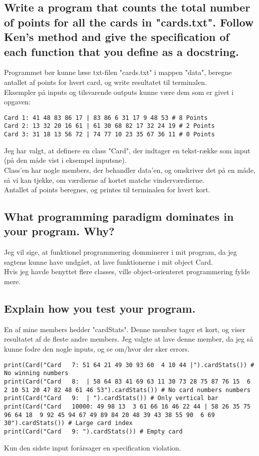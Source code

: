 \documentclass[a4paper,12pt]{article}
\begin{document}
\subsection[Write a program that counts the total number of points for all the cards]{Write a program that counts the total number of points for all the cards in "cards.txt".
Follow Ken's method and give the specification of each function that you define as a docstring.}

Programmet bør kunne læse txt-filen "cards.txt" i mappen "data", beregne antallet af points for hvert card, og write resultatet til terminalen.\\
Eksempler på inputs og tilsvarende outputs kunne være dem som er givet i opgaven:
\begin{lstlisting}
Card 1: 41 48 83 86 17 | 83 86 6 31 17 9 48 53 # 8 Points
Card 2: 13 32 20 16 61 | 61 30 68 82 17 32 24 19 # 2 Points
Card 3: 31 18 13 56 72 | 74 77 10 23 35 67 36 11 # 0 Points
\end{lstlisting} 
Jeg har valgt, at definere en class "Card", der indtager en tekst-række som input (på den måde vist i eksempel inputsne).\\
Class'en har nogle members, der behandler data'en, og omskriver det på en måde, så vi kan tjekke, om værdierne af kortet matche vinderværdierne.\\
Antallet af points beregnes, og printes til terminalen for hvert kort.

\subsection[What programming paradigm dominates in your program]{What programming paradigm dominates in your program. Why?}

Jeg vil sige, at funktionel programmering domminerer i mit program, da jeg sagtens kunne have undgået, at lave funktionerne i mit object Card.\\
Hvis jeg havde benyttet flere classes, ville object-orienteret programmering fylde mere. 

\subsection[Explain how you test your program]{Explain how you test your program.}

En af mine members hedder "cardStats". Denne member tager et kort, og viser resultatet af de fleste andre members. Jeg valgte at lave denne member, da jeg så kunne fodre den nogle inputs, og se om/hvor der sker errors.
\begin{lstlisting}
print(Card("Card   7: 51 64 21 49 30 93 60  4 10 44 |").cardStats()) # No winning numbers
print(Card("Card   8:  | 58 64 83 41 69 63 11 30 73 28 75 87 76 15  6  2 10 51 20 47 82 48 61 46 53").cardStats()) # No card numbers numbers
print(Card("Card   9:  | ").cardStats()) # Only vertical bar
print(Card("Card   10000: 49 98 13  3 61 66 16 46 22 44 | 58 26 35 75 96 64 18  9 92 45 94 67 49 89 84 20 48 39 43 38 55 90  6 69 30").cardStats()) # Large card index
print(Card("Card   9: ").cardStats()) # Empty card
\end{lstlisting}
Kun den sidste input forårsager en specification violation. 
\end{document}
